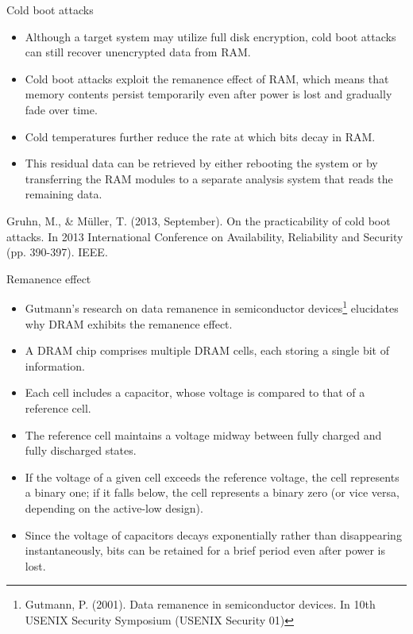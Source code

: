 \begin{frame}{Cold boot attacks}
    \begin{itemize}
        \item Although a target system may utilize full disk encryption, cold boot attacks can still recover unencrypted data from RAM. 
        \item Cold boot attacks exploit the remanence effect of RAM, which means that memory contents persist temporarily even after power is lost and gradually fade over time. 
        \item Cold temperatures further reduce the rate at which bits decay in RAM.
        \item  This residual data can be retrieved by either rebooting the system or by transferring the RAM modules to a separate analysis system that reads the remaining data.
    \end{itemize}
    \vfill
    {\small Gruhn, M., \& Müller, T. (2013, September). On the practicability of cold boot attacks. In 2013 International Conference on Availability, Reliability and Security (pp. 390-397). IEEE.}
\end{frame}

\begin{frame}{Remanence effect}
    \begin{itemize}
        \item Gutmann's research on data remanence in semiconductor devices\footnote{Gutmann, P. (2001). Data remanence in semiconductor devices. In 10th USENIX Security Symposium (USENIX Security 01)} elucidates why DRAM exhibits the remanence effect. \item A DRAM chip comprises multiple DRAM cells, each storing a single bit of information.
        \item Each cell includes a capacitor, whose voltage is compared to that of a reference cell. 
        \item The reference cell maintains a voltage midway between fully charged and fully discharged states. 
        \item If the voltage of a given cell exceeds the reference voltage, the cell represents a binary one; if it falls below, the cell represents a binary zero (or vice versa, depending on the active-low design). \item Since the voltage of capacitors decays exponentially rather than disappearing instantaneously, bits can be retained for a brief period even after power is lost.
    \end{itemize}
\end{frame}


